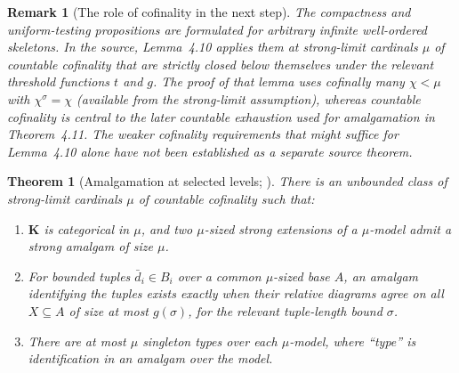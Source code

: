 \documentclass[11pt]{article}
\newcommand{\K}{\mathbf K}
\theoremstyle{plain}
\newtheorem{theorem}[definition]{Theorem}
\newtheorem{remark}[definition]{Remark}
\begin{document}
\begin{remark}[The role of cofinality in the next step]
The compactness and uniform-testing propositions are
formulated for arbitrary infinite well-ordered skeletons.
In the source, Lemma~4.10 applies them at strong-limit
cardinals $\mu$ of countable cofinality that are
strictly closed below themselves under the relevant
threshold functions $t$ and $g$. The proof of that
lemma uses cofinally many $\chi<\mu$ with
$\chi^\sigma=\chi$ (available from the strong-limit
assumption), whereas countable cofinality is central
to the later countable exhaustion used for
amalgamation in Theorem~4.11.
The weaker cofinality requirements that might suffice
for Lemma~4.10 alone have not been established as a
separate source theorem.
\end{remark}

\begin{theorem}[Amalgamation at selected levels; {\cite[Theorem 4.11]{oai-ecc}}]\label{thm:amalgamation-closed}
There is an unbounded class of strong-limit cardinals $\mu$ of countable cofinality such that:
\begin{enumerate}[label=(\arabic*)]
\item $\K$ is categorical in $\mu$, and two $\mu$-sized strong extensions of a $\mu$-model admit a strong amalgam of size $\mu$.
\item For bounded tuples $\bar d_i\in B_i$ over a common $\mu$-sized base $A$, an amalgam identifying the tuples exists exactly when their relative diagrams agree on all $X\subseteq A$ of size at most $g(\sigma)$, for the relevant tuple-length bound $\sigma$.
\item There are at most $\mu$ singleton types over each $\mu$-model, where ``type'' is identification in an amalgam over the model.
\end{enumerate}
\end{theorem}
\end{document}
